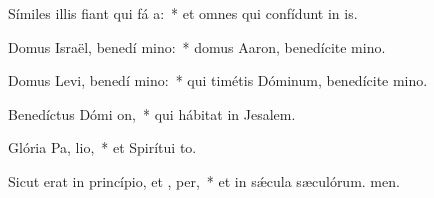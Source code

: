 \item Símiles illis fiant qui fá a:~* et omnes qui confídunt in is.
\item Domus Israël, benedí mino:~* domus Aaron, benedícite mino.
\item Domus Levi, benedí mino:~* qui timétis Dóminum, benedícite mino.
\item Benedíctus Dómi  on,~* qui hábitat in Jesalem.
\item Glória Pa,  lio,~* et Spirítui to.
\item Sicut erat in princípio, et ,  per,~* et in sǽcula sæculórum. men.
